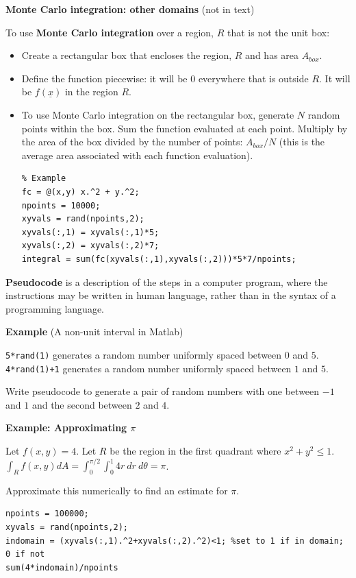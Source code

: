 \documentclass[12pt,letterpaper,noanswers]{exam}
\begin{document}
\noindent\textbf{Monte Carlo integration: other domains} (not in text)
\begin{tcolorbox}
To use \textbf{Monte Carlo integration} over a region, $R$ that is not the unit box:
\begin{itemize}
\itemsep0em
    \item Create a rectangular box that encloses the region, $R$ and has area $A_{box}$. 
    \item Define the function piecewise: it will be $0$ everywhere that is outside $R$.  It will be $f(\underline{x})$ in the region $R$.
    \item To use Monte Carlo integration on the rectangular box, generate $N$ random points within the box.  Sum the function evaluated at each point.  Multiply by the area of the box divided by the number of points: $A_{box}/N$ (this is the average area associated with each function evaluation).
    \begin{lstlisting}
% Example
fc = @(x,y) x.^2 + y.^2;
npoints = 10000;
xyvals = rand(npoints,2);
xyvals(:,1) = xyvals(:,1)*5;
xyvals(:,2) = xyvals(:,2)*7;
integral = sum(fc(xyvals(:,1),xyvals(:,2)))*5*7/npoints;
\end{lstlisting}
\end{itemize}

\textbf{Pseudocode} is a description of the steps in a computer program, where the instructions may be written in human language, rather than in the syntax of a programming language.
\end{tcolorbox}

    \noindent\textbf{Example} (A non-unit interval in Matlab)
    
    \texttt{5*rand(1)} generates a random number uniformly spaced between $0$ and $5$.  \texttt{4*rand(1)+1} generates a random number uniformly spaced between $1$ and $5$.
    
    Write pseudocode to generate a pair of random numbers with one between $-1$ and $1$ and the second between $2$ and $4$.
    \vspace{1in}
    
    \eject

\noindent\textbf{Example: Approximating $\pi$}

Let $f(x,y) = 4$.  Let $R$ be the region in the first quadrant where $x^2+y^2\leq 1$.  $\int_R f(x,y) dA = \int_0^{\pi/2}\int_0^1 4r\ dr\ d\theta = \pi$.

Approximate this numerically to find an estimate for $\pi$.
\begin{lstlisting}   
npoints = 100000;
xyvals = rand(npoints,2);
indomain = (xyvals(:,1).^2+xyvals(:,2).^2)<1; %set to 1 if in domain; 0 if not
sum(4*indomain)/npoints
\end{lstlisting}
\end{document}
